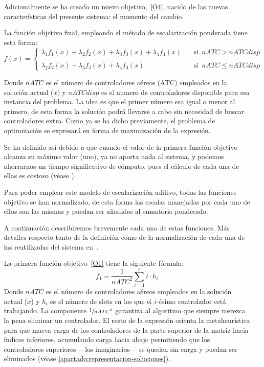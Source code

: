 Adicionalmente se ha creado un nuevo objetivo,~\ref{O4}, nacido de las nuevas características del presente sistema: el momento del cambio.


La función objetivo final, empleando el método de escalarización ponderada tiene esta forma:
\[
	f(x)= 
	\begin{cases}
		\lambda_1 f_1(x) + \lambda_2 f_2(x) + \lambda_3 f_3(x) + \lambda_4 f_4(x) & \quad \textrm{si } \, nATC > nATCdisp  \\
		\\
		\lambda_2 f_2(x) + \lambda_3 f_3(x) + \lambda_4 f_4(x)                    & \quad \textrm{si } \,  nATC \le nATCdisp
	\end{cases}
\]

Donde $nATC$ es el número de controladores aéreos (\gls{ATC}) empleados en la solución actual ($x$) y $nATCdisp$ es el numero de controladores disponible para esa instancia del problema. La idea es que el primer número sea igual o menor al primero, de esta forma la solución podrá llevarse a cabo sin necesidad de buscar controladores extra. Como ya se ha dicho previamente, el problema de optimización se expresará en forma de maximización de la expresión.

Se ha definido así debido a que cuando el valor de la primera función objetivo alcanza su máximo valor (uno), ya no aporta nada al sistema, y podemos ahorrarnos un tiempo significativo de cómputo, pues el cálculo de cada una de ellas es costoso (véase ).%

Para poder emplear este modelo de escalarización aditivo, todas las funciones objetivo se han normalizado, de esta forma las escalas manejadas por cada uno de ellos son las mismas y puedan ser añadidos al sumatorio ponderado.

A continuación describiremos brevemente cada una de estas funciones. Más detalles respecto tanto de la definición como de la normalización de cada una de las reutilizadas del sistema \legacy{} en~\cite{articulo2}.

La primera función objetivo~\ref{O1} tiene la siguiente fórmula:
\[ f_1 = \frac{1}{nATC^2} \sum_{i=1}^c i\cdot h_i \]
Donde $nATC$ es el número de controladores aéreos empleados en la solución actual ($x$) y $h_i$ es el número de slots en los que el $i$-ésimo controlador está trabajando. La componente $\sfrac{1}{nATC^2}$ garantiza al algoritmo que siempre merezca la pena eliminar un controlador. El resto de la expresión orienta la metaheurística para que mueva carga de los controladores de la parte superior de la matriz hacia índices inferiores, acumulando carga hacia abajo permitiendo que los controladores superiores ---los imaginarios--- se queden sin carga y puedan ser eliminados (véase \autoref{apartado:representacion-soluciones}).

